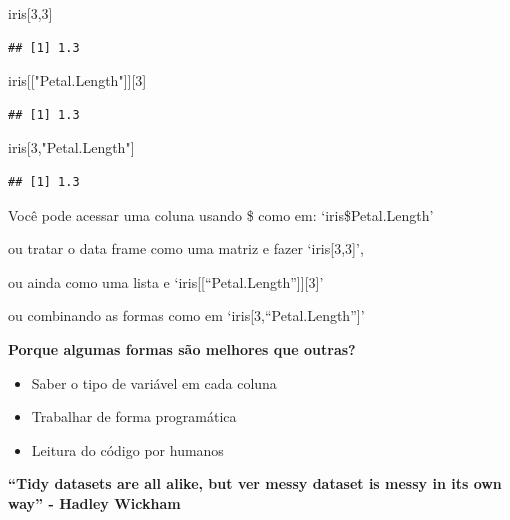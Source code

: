 \documentclass[
]{article}
\newenvironment{Shaded}{\begin{snugshade}}{\end{snugshade}}
\newcommand{\DecValTok}[1]{\textcolor[rgb]{0.00,0.00,0.81}{#1}}
\newcommand{\NormalTok}[1]{#1}
\newcommand{\StringTok}[1]{\textcolor[rgb]{0.31,0.60,0.02}{#1}}
\begin{document}
\begin{Shaded}
\begin{Highlighting}[]
\NormalTok{iris[}\DecValTok{3}\NormalTok{,}\DecValTok{3}\NormalTok{]}
\end{Highlighting}
\end{Shaded}

\begin{verbatim}
## [1] 1.3
\end{verbatim}

\begin{Shaded}
\begin{Highlighting}[]
\NormalTok{iris[[}\StringTok{"Petal.Length"}\NormalTok{]][}\DecValTok{3}\NormalTok{]}
\end{Highlighting}
\end{Shaded}

\begin{verbatim}
## [1] 1.3
\end{verbatim}

\begin{Shaded}
\begin{Highlighting}[]
\NormalTok{iris[}\DecValTok{3}\NormalTok{,}\StringTok{"Petal.Length"}\NormalTok{]}
\end{Highlighting}
\end{Shaded}

\begin{verbatim}
## [1] 1.3
\end{verbatim}

Você pode acessar uma coluna usando \$ como em: `iris\$Petal.Length'

ou tratar o data frame como uma matriz e fazer `iris{[}3,3{]}',

ou ainda como uma lista e `iris{[}{[}``Petal.Length''{]}{]}{[}3{]}'

ou combinando as formas como em `iris{[}3,``Petal.Length''{]}'

\textbf{Porque algumas formas são melhores que outras?}

\begin{itemize}
\item
  Saber o tipo de variável em cada coluna
\item
  Trabalhar de forma programática
\item
  Leitura do código por humanos
\end{itemize}

\textbf{``Tidy datasets are all alike, but ver messy dataset is messy in
its own way'' - Hadley Wickham}
\end{document}
